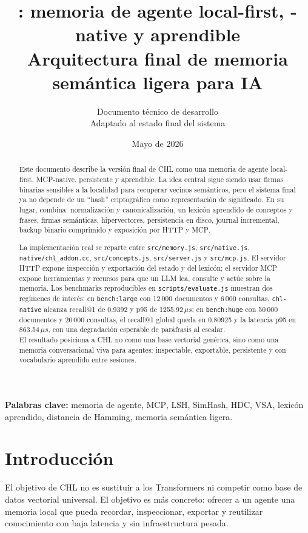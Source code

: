 \documentclass[11pt]{article}
\title{\vspace{-1.3em}\textbf{\CHL{}: memoria de agente local-first, \MCP{}-native y aprendible}\\
\Large Arquitectura final de memoria semántica ligera para IA}
\author{Documento técnico de desarrollo\\Adaptado al estado final del sistema}
\date{Mayo de 2026}
\newcommand{\CHL}{\textsc{CHL}}
\newcommand{\LSH}{\textsc{LSH}}
\newcommand{\HDC}{\textsc{HDC}}
\newcommand{\VSA}{\textsc{VSA}}
\newcommand{\MCP}{\textsc{MCP}}
\begin{document}
\maketitle

\begin{abstract}
Este documento describe la versión final de \CHL{} como una memoria de agente local-first, \MCP{}-native, persistente y aprendible. La idea central sigue siendo usar firmas binarias sensibles a la localidad para recuperar vecinos semánticos, pero el sistema final ya no depende de un ``hash'' criptográfico como representación de significado. En su lugar, combina: normalización y canonicalización, un lexicón aprendido de conceptos y frases, firmas semánticas, hipervectores, persistencia en disco, journal incremental, backup binario comprimido y exposición por HTTP y \MCP{}.

La implementación real se reparte entre \texttt{src/memory.js}, \texttt{src/native.js}, \texttt{native/chl\_addon.cc}, \texttt{src/concepts.js}, \texttt{src/server.js} y \texttt{src/mcp.js}. El servidor HTTP expone inspección y exportación del estado y del lexicón; el servidor \MCP{} expone herramientas y recursos para que un LLM lea, consulte y actúe sobre la memoria. Los benchmarks reproducibles en \texttt{scripts/evaluate.js} muestran dos regímenes de interés: en \texttt{bench:large} con 12\,000 documentos y 6\,000 consultas, \texttt{chl-native} alcanza recall@1 de 0.9392 y p95 de 1255.92\,\(\mu s\); en \texttt{bench:huge} con 50\,000 documentos y 20\,000 consultas, el recall@1 global queda en 0.80925 y la latencia p95 en 863.54\,\(\mu s\), con una degradación esperable de paráfrasis al escalar.
\\
El resultado posiciona a \CHL{} no como una base vectorial genérica, sino como una memoria conversacional viva para agentes: inspectable, exportable, persistente y con vocabulario aprendido entre sesiones.
\end{abstract}

\textbf{Palabras clave:} memoria de agente, \MCP{}, \LSH{}, SimHash, \HDC{}, \VSA{}, lexicón aprendido, distancia de Hamming, memoria semántica ligera.

\tableofcontents
\newpage

\section{Introducción}

El objetivo de \CHL{} no es sustituir a los Transformers ni competir como base de datos vectorial universal. El objetivo es más concreto: ofrecer a un agente una memoria local que pueda recordar, inspeccionar, exportar y reutilizar conocimiento con baja latencia y sin infraestructura pesada.
\end{document}
